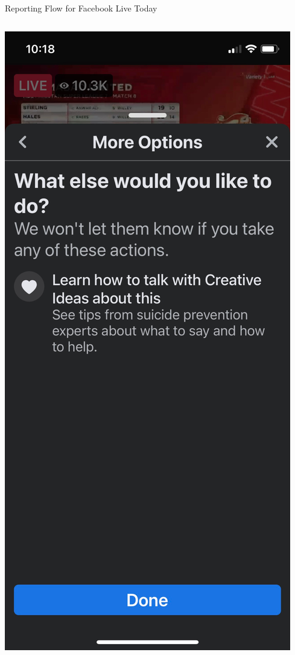 \documentclass[nobackground,dvipsnames,table,aspectratio=169]{beamer}
\begin{document}
\begin{frame}{Reporting Flow for Facebook Live Today}
\begin{columns}
            \includegraphics[width=\textwidth]{facebook-live-current-reporting-flow-3}

\end{columns}
\end{frame}
\end{document}
